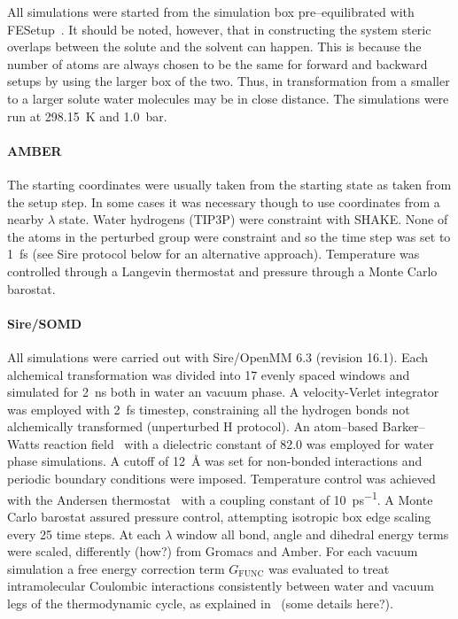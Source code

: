 \documentclass[journal=jctcce,manuscript=article]{achemso}
\begin{document}
All simulations were started from the simulation box pre--equilibrated with
FESetup~\cite{loeffler_fesetup:_2015}.  It should be noted, however, that in
constructing the system steric overlaps between the solute and the solvent can
happen.  This is because the number of atoms are always chosen to be the same
for forward and backward setups by using the larger box of the two.  Thus, in
transformation from a smaller to a larger solute water molecules may be in
close distance.  The simulations were run at \SI{298.15}{K} and \SI{1.0}{bar}.

\paragraph{AMBER} The starting coordinates were usually taken from the
starting state as taken from the setup step.  In some cases it was
necessary though to use coordinates from a nearby $\lambda$ state.
Water hydrogens (TIP3P) were constraint with SHAKE.  None of the atoms
in the perturbed group were constraint and so the time step was set to
\SI{1}{fs} (see Sire protocol below for an alternative approach).
Temperature was controlled through a Langevin thermostat and pressure
through a Monte Carlo barostat.

\paragraph{Sire/SOMD} All simulations were carried out with
Sire/OpenMM 6.3 (revision 16.1).  Each alchemical transformation was
divided into 17 evenly spaced windows and simulated for \SI{2}{ns}
both in water an vacuum phase. A velocity-Verlet integrator was
employed with \SI{2}{fs} timestep, constraining all the hydrogen bonds
not alchemically transformed (unperturbed H protocol). An atom--based
Barker--Watts reaction field~\cite{doi:10.1080/00268977300102101} with
a dielectric constant of \num{82.0} was employed for water phase
simulations. A cutoff of \SI{12}{\angstrom} was set for non-bonded
interactions and periodic boundary conditions were imposed.
Temperature control was achieved with the Andersen
thermostat~\cite{doi:10.1063/1.439486} with a coupling constant of
\SI{10}{ps^{-1}}.  A Monte Carlo barostat assured pressure control,
attempting isotropic box edge scaling every 25 time steps. At each
$\lambda$ window all bond, angle and dihedral energy terms were
scaled, differently (how?) from Gromacs and Amber.  For each vacuum
simulation a free energy correction term $G_{\mathrm{FUNC}}$ was
evaluated to treat intramolecular Coulombic interactions consistently
between water and vacuum legs of the thermodynamic cycle, as explained
in~\cite{Bosisio2016} (some details here?).
\end{document}

